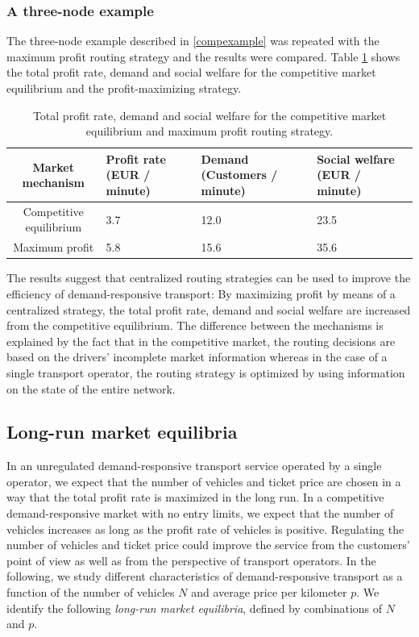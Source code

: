 \documentclass[dissertation,draft*]{aaltoseries}
\begin{document}
\subsubsection{A three-node example}
The three-node example described in \ref{compexample} was repeated with the maximum profit routing strategy and 
the results were compared. Table \ref{verkkovertailu} shows the total profit rate, demand and social welfare for 
the competitive market equilibrium and the profit-maximizing strategy.

\begin{table}[ht]
\begin{center}
{\footnotesize
\begin{tabular}{|c|p{2.4cm}p{2.4cm}p{2.4cm}|}
\hline
Market mechanism & Profit rate (EUR / minute) & Demand (Customers / minute) & Social welfare (EUR / minute)\\
\hline
Competitive equilibrium & 3.7 & 12.0 & 23.5 \\
Maximum profit & 5.8 & 15.6 & 35.6 \\
\hline 
\end{tabular}
\caption{Total profit rate, demand and social welfare for the competitive market equilibrium and maximum profit routing strategy.}
\label{verkkovertailu}
}
\end{center}
\end{table}

The results suggest that centralized routing strategies can be used to improve the efficiency of demand-responsive transport:
By maximizing profit by means of a centralized strategy, the total profit rate, demand and social welfare are increased from
the competitive equilibrium. The difference between the mechanisms is explained by the fact that in the competitive market, 
the routing decisions are based on the drivers' incomplete market information whereas in the case of a single transport operator,
the routing strategy is optimized by using information on the state of the entire network.



\subsection{Long-run market equilibria}
\label{longrun}
In an unregulated demand-responsive transport service operated by a single operator, 
we expect that the number of vehicles and ticket price are chosen in a way that
the total profit rate is maximized in the long run.
In a competitive demand-responsive market with no entry limits, 
we expect that the number of vehicles increases as long as the profit
rate of vehicles is positive. 
Regulating the number of vehicles and ticket price could improve the service
from the customers' point of view as well as from the perspective of transport operators.
In the following, we study different characteristics of demand-responsive transport
as a function of the number of vehicles $N$ and average price per kilometer $p$.
We identify the following \emph{long-run market equilibria}, defined by combinations of $N$ and $p$.
\end{document}

